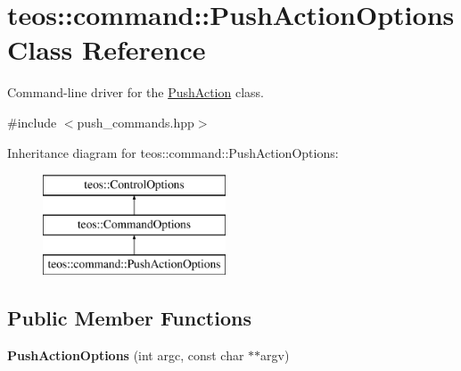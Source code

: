 \hypertarget{classteos_1_1command_1_1_push_action_options}{}\section{teos\+:\+:command\+:\+:Push\+Action\+Options Class Reference}
\label{classteos_1_1command_1_1_push_action_options}


Command-\/line driver for the \mbox{\hyperlink{classteos_1_1command_1_1_push_action}{Push\+Action}} class.  




{\ttfamily \#include $<$push\+\_\+commands.\+hpp$>$}

Inheritance diagram for teos\+:\+:command\+:\+:Push\+Action\+Options\+:\begin{figure}[H]
\begin{center}
\leavevmode
\includegraphics[height=3.000000cm]{classteos_1_1command_1_1_push_action_options}
\end{center}
\end{figure}
\subsection*{Public Member Functions}
\begin{DoxyCompactItemize}
\item 
\mbox{\label{classteos_1_1command_1_1_push_action_options_a3bb2cab6e95fe807a16f62dac7252664}} 
{\bfseries Push\+Action\+Options} (int argc, const char $\ast$$\ast$argv)
\end{DoxyCompactItemize}
